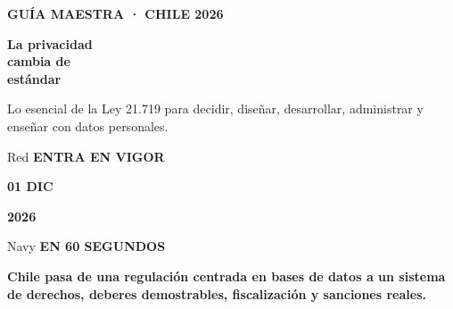 \documentclass[11pt,a4paper]{article}
\newcommand{\eyebrow}[1]{\fontsize{8.5}{10}\selectfont\bfseries\color{Red}\MakeUppercase{#1}}
\newcommand{\lead}[1]{\fontsize{12}{16}\selectfont\color{Neutral}#1}
\begin{document}
\RaggedRight

\thispagestyle{fancy}
\vspace*{2mm}
\eyebrow{Guía maestra · Chile 2026}\par\vspace{6mm}
\begin{minipage}[t]{0.62\textwidth}
  \fontsize{39}{40}\selectfont\bfseries\color{Navy}La privacidad\\cambia de\\estándar\par
  \vspace{4mm}
  \lead{Lo esencial de la Ley 21.719 para decidir, diseñar, desarrollar, administrar y enseñar con datos personales.}
\end{minipage}\hfill
\begin{minipage}[t]{0.29\textwidth}
  \begin{softcard}{Red}
    \color{White}\fontsize{10}{12}\selectfont\bfseries ENTRA EN VIGOR\par\vspace{2mm}
    \fontsize{30}{30}\selectfont\bfseries 01 DIC\par
    \fontsize{17}{20}\selectfont\bfseries 2026
  \end{softcard}
\end{minipage}

\vspace{8mm}
\begin{softcard}{Navy}
  \color{White}
  \eyebrow{En 60 segundos}\color{White}\par\vspace{2mm}
  \fontsize{18}{23}\selectfont\bfseries Chile pasa de una regulación centrada en bases de datos a un sistema de derechos, deberes demostrables, fiscalización y sanciones reales.
\end{softcard}
\end{document}
